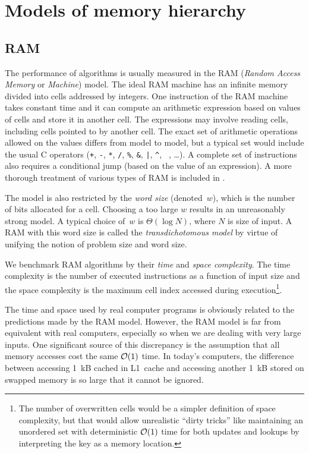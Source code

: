 \chapter{Models of memory hierarchy}
\label{chapter:models}
\section{RAM}

The performance of algorithms is usually measured in the RAM
(\emph{Random Access Memory} or \emph{Machine}) model.
The ideal RAM machine has an infinite memory divided into cells addressed
by integers.
One instruction of the RAM machine takes constant time and it
can compute an arithmetic expression based on values of cells and store it
in another cell. The expressions may involve reading cells, including cells
pointed to by another cell. The exact set of arithmetic operations allowed
on the values differs from model to model, but a typical set would include
the usual C operators (\texttt{+}, \texttt{-}, \texttt{*}, \texttt{/},
\texttt{\%}, \texttt{\&}, \texttt{|}, \texttt{\^}, \texttt{~}, \dots).
A complete set of instructions also requires a conditional jump (based on
the value of an expression).
A more thorough treatment of various types of RAM is included
in \cite{saga-of-msts}.

The model is also restricted by the \textit{word size} (denoted~$w$),
which is the number of bits allocated for a cell. Choosing a too large $w$
results in an unreasonably strong model. A typical choice of~$w$ is
$\Theta(\log N)$, where $N$ is size of input.
A RAM with this word size is called the \textit{transdichotomous model}
by virtue of unifying the notion of problem size and word size.

We benchmark RAM algorithms by their \emph{time} and \emph{space complexity}.
The time complexity is the number of executed instructions as a function of
input size and the space complexity is the maximum cell index accessed during
execution\footnote{
	The number of overwritten cells would be a simpler definition
	of space complexity, but that would allow unrealistic ``dirty tricks''
	like maintaining an unordered set with deterministic $\mathcal{O}(1)$ time
	for both updates and lookups by interpreting the key as a memory
	location.
}.

The time and space used by real computer programs is obviously related
to the predictions made by the RAM model. However, the RAM model is far
from equivalent with real computers, especially so when we are dealing with
very large inputs. One significant source of this discrepancy is the assumption
that all memory accesses cost the same $\mathcal{O}(1)$ time. In today's computers,
the difference between accessing 1~kB cached in L1~cache and accessing
another 1~kB stored on swapped memory is so large that it cannot be ignored.


